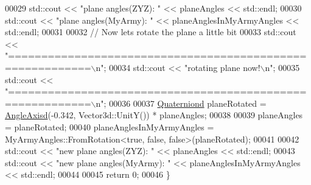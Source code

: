 \begin{DoxyCode}
00029   std::cout << \textcolor{stringliteral}{"plane angles(ZYZ):        "} << planeAngles << std::endl;
00030   std::cout << \textcolor{stringliteral}{"plane angles(MyArmy):     "} << planeAnglesInMyArmyAngles << std::endl;
00031   
00032   \textcolor{comment}{// Now lets rotate the plane a little bit}
00033   std::cout << \textcolor{stringliteral}{"==========================================================\(\backslash\)n"};
00034   std::cout << \textcolor{stringliteral}{"rotating plane now!\(\backslash\)n"};
00035   std::cout << \textcolor{stringliteral}{"==========================================================\(\backslash\)n"};
00036   
00037   \hyperlink{group___geometry___module_class_eigen_1_1_quaternion}{Quaterniond} planeRotated = \hyperlink{group___geometry___module_gac218cd8f23b49aa36401d0c843bb6835}{AngleAxisd}(-0.342, Vector3d::UnitY()) * planeAngles;
00038   
00039   planeAngles = planeRotated;
00040   planeAnglesInMyArmyAngles = MyArmyAngles::FromRotation<true, false, false>(planeRotated);
00041   
00042   std::cout << \textcolor{stringliteral}{"new plane angles(ZYZ):     "} << planeAngles << std::endl;
00043   std::cout << \textcolor{stringliteral}{"new plane angles(MyArmy): "} << planeAnglesInMyArmyAngles << std::endl;
00044   
00045   \textcolor{keywordflow}{return} 0;
00046 \}
\end{DoxyCode}
